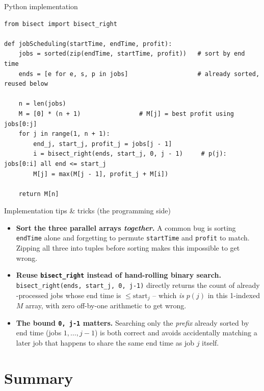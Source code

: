 \documentclass[11pt,aspectratio=169]{beamer}
\begin{document}
\begin{frame}[fragile]{Python implementation}
  \begin{lstlisting}[style=py]
from bisect import bisect_right

def jobScheduling(startTime, endTime, profit):
    jobs = sorted(zip(endTime, startTime, profit))   # sort by end time
    ends = [e for e, s, p in jobs]                   # already sorted, reused below

    n = len(jobs)
    M = [0] * (n + 1)                # M[j] = best profit using jobs[0:j]
    for j in range(1, n + 1):
        end_j, start_j, profit_j = jobs[j - 1]
        i = bisect_right(ends, start_j, 0, j - 1)     # p(j): jobs[0:i] all end <= start_j
        M[j] = max(M[j - 1], profit_j + M[i])

    return M[n]
  \end{lstlisting}
\end{frame}

\begin{frame}{Implementation tips \& tricks (the programming side)}
  \small
  \begin{itemize}
    \item \textbf{Sort the three parallel arrays \emph{together}.} A common bug is
    sorting \texttt{endTime} alone and forgetting to permute \texttt{startTime} and
    \texttt{profit} to match. Zipping all three into tuples before sorting makes this
    impossible to get wrong.
    \item \textbf{Reuse \texttt{bisect\_right} instead of hand-rolling binary search.}
    \texttt{bisect\_right(ends, start\_j, 0, j-1)} directly returns the count of already
    -processed jobs whose end time is $\le \text{start}_j$ -- which \emph{is} $p(j)$ in
    this 1-indexed $M$ array, with zero off-by-one arithmetic to get wrong.
    \item \textbf{The bound \texttt{0, j-1} matters.} Searching only the \emph{prefix}
    already sorted by end time (jobs $1,\dots,j-1$) is both correct and avoids
    accidentally matching a later job that happens to share the same end time as job
    $j$ itself.
  \end{itemize}
\end{frame}

\section{Summary}
\end{document}
